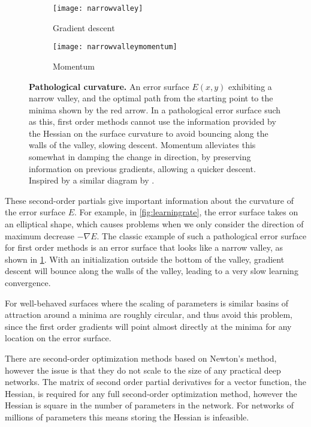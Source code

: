 \documentclass[thesis]{subfiles}
\begin{document}
\begin{figure}[tbp]
\centering
\begin{subfigure}[b]{0.45\textwidth}
\texttt{[image: narrowvalley]}
\caption{Gradient descent}\label{fig:narrowvalleysgd}
\end{subfigure}
\begin{subfigure}[b]{0.45\textwidth}
\texttt{[image: narrowvalleymomentum]}
\caption{Momentum}\label{fig:narrowvalleymomentum}
\end{subfigure}
\caption[Pathological curvature]{\textbf{Pathological curvature.} An error surface $E(x, y)$ exhibiting a narrow valley, and the optimal path from the starting point to the minima shown by the red arrow. In a pathological error surface such as this, first order methods cannot use the information provided by the Hessian on the surface curvature to avoid bouncing along the walls of the valley, slowing descent. Momentum alleviates this somewhat in damping the change in direction, by preserving information on previous gradients, allowing a quicker descent. Inspired by a similar diagram by \citet{martens2010deep}.}
\label{fig:pathological}
\end{figure}
These second-order partials give important information about the curvature of the error surface $E$. For example, in \cref{fig:learningrate}, the error surface takes on an elliptical shape, which causes problems when we only consider the direction of maximum decrease $-\nabla E$. The classic example of such a pathological error surface for first order methods is an error surface that looks like a narrow valley, as shown in \cref{fig:narrowvalleysgd}. With an initialization outside the bottom of the valley, gradient descent will bounce along the walls of the valley, leading to a very slow learning convergence.

For well-behaved surfaces where the scaling of parameters is similar
basins of attraction around a minima are roughly circular, and thus avoid this problem, since the first order gradients will point almost directly at the minima for any location on the error surface.

There are second-order optimization methods based on Newton's method, however the issue is that they do not scale to the size of any practical deep networks. The matrix of second order partial derivatives for a vector function, the Hessian, is required for any full second-order optimization method, however the Hessian is square in the number of parameters in the network. For networks of millions of parameters this means storing the Hessian is infeasible.
\end{document}
